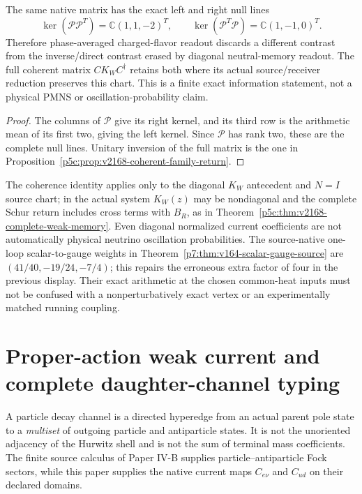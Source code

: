 \documentclass[12pt,a4paper]{article}
\begin{document}
\begin{corollary}
\label{p5c:cor:v348-coherent-diagonal-blindness}
The same native matrix has the exact left and right null lines
\[
 \boxed{\ker(\mathcal P\mathcal P^T)=\mathbb C(1,1,-2)^T,
 \qquad \ker(\mathcal P^T\mathcal P)=\mathbb C(1,-1,0)^T.}
\]
Therefore phase-averaged charged-flavor readout discards a different
contrast from the inverse/direct contrast erased by diagonal
neutral-memory readout.  The full coherent matrix $CK_WC^\dagger$
retains both where its actual source/receiver reduction preserves
this chart.  This is a finite exact information statement, not a
physical PMNS or oscillation-probability claim.
\end{corollary}
\begin{proof}
The columns of $\mathcal P$ give its right kernel, and its third
row is the arithmetic mean of its first two, giving the left
kernel.  Since $\mathcal P$ has rank two, these are the complete
null lines.  Unitary inversion of the full matrix is the one in
Proposition~\ref{p5c:prop:v2168-coherent-family-return}.
\end{proof}

\begin{remark}
\label{p5c:rem:v348-weak-memory-physical-guard}
The coherence identity applies only to the diagonal $K_W$ antecedent
and $N=I$ source chart; in the actual system $K_W(z)$ may be
nondiagonal and the complete Schur return includes cross terms with
$B_R$, as in Theorem~\ref{p5c:thm:v2168-complete-weak-memory}.
Even diagonal normalized current coefficients are not automatically
physical neutrino oscillation probabilities.  The source-native
one-loop scalar-to-gauge weights in
Theorem~\ref{p7:thm:v164-scalar-gauge-source} are
$(41/40,-19/24,-7/4)$; this repairs the erroneous extra factor
of four in the previous display.  Their exact arithmetic at the
chosen common-heat inputs must not be confused with a
nonperturbatively exact vertex or an experimentally matched running
coupling.
\end{remark}

\printbibliography

\section[Proper-action weak current and complete daughter-channel typing]{Proper-action weak current and\\ complete daughter-channel typing}
\label{p5c:sec:v365-decay-hyperedge}
A particle decay channel is a directed hyperedge from an actual
parent pole state to a \emph{multiset} of outgoing particle and
antiparticle states.  It is not the unoriented adjacency of the
Hurwitz shell and is not the sum of terminal mass coefficients.
The finite source calculus of Paper IV-B supplies particle--antiparticle
Fock sectors, while this paper supplies the native current maps
$C_{e\nu}$ and $C_{ud}$ on their declared domains.
\end{document}
